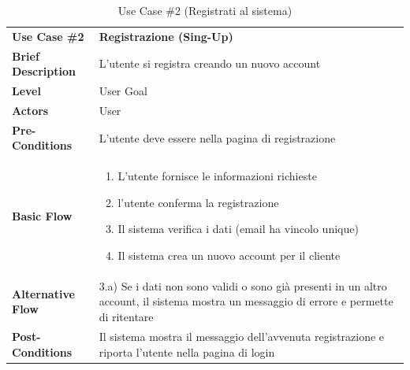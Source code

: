 	\vspace{1cm} 
	
	\begin{table}[h]
		\centering
		\setlength{\arrayrulewidth}{0.8pt} %
		
		\begin{tabular}{|l p{12cm}|}
			\hline
			
			\rowcolor{gray!25}
			\textbf{Use Case \#2} & \textbf{Registrazione (Sing-Up)} \\ 
			\textbf{Brief Description} & L'utente si registra creando un nuovo account \\
			\textbf{Level} & User Goal \\ 
			\textbf{Actors} & User \\ 
			\textbf{Pre-Conditions} & L'utente deve essere nella pagina di registrazione \\ %
			\textbf{Basic Flow} & \begin{enumerate}[label=\arabic*), leftmargin=*, before=\vspace{-0.7cm}, after=\vspace{-0.4cm}]
				\item L'utente  fornisce le informazioni richieste
				\item l'utente conferma la registrazione
				\item Il sistema verifica i dati (email ha vincolo unique)
				\item Il sistema crea un nuovo account per il cliente
			\end{enumerate} \\ 
			\textbf{Alternative Flow} & 3.a) Se i dati non sono validi o sono già presenti in un altro account, il sistema mostra un messaggio di errore e permette di ritentare\\ 
			\textbf{Post-Conditions} & Il sistema mostra il messaggio dell'avvenuta registrazione e riporta l'utente nella pagina di login \\ 
			
			\hline
		\end{tabular}
		
		\vspace{0.2cm}
		\caption{Use Case \#2 (Registrati al sistema)}
	\end{table}
	
	\vspace{1cm} 
	
